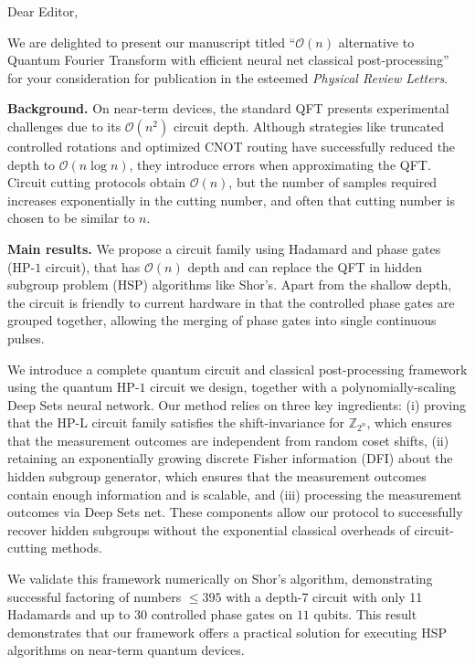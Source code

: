 \documentclass[11pt]{letter}
\newcommand{\ManuscriptTitle}{\(\mathcal{O}(n)\) alternative to Quantum Fourier Transform with efficient neural net classical post-processing}
\newcommand{\Journal}{\textit{Physical Review Letters}}
\begin{document}
\begin{letter}{}

\opening{Dear Editor,}

We are delighted to present our manuscript titled ``\ManuscriptTitle'' for your consideration for publication in the esteemed \Journal.

\textbf{Background.}
On near-term devices, the standard QFT presents experimental challenges due to its \(\mathcal{O}(n^{2})\) circuit depth. Although strategies like truncated controlled rotations and optimized CNOT routing have successfully reduced the depth to \(\mathcal{O}(n \log n)\), they introduce errors when approximating the QFT. Circuit cutting protocols obtain \(\mathcal{O}(n)\), but the number of samples required increases exponentially in the cutting number, and often that cutting number is chosen to be similar to \(n\). 

\textbf{Main results.}
We propose a circuit family using Hadamard and phase gates (HP-\(1\) circuit), that has \(\mathcal{O}(n)\) depth and can replace the QFT in hidden subgroup problem (HSP) algorithms like Shor's. Apart from the shallow depth, the circuit is friendly to current hardware in that the controlled phase gates are grouped together, allowing the merging of phase gates into single continuous pulses.

We introduce a complete quantum circuit and classical post-processing framework using the quantum HP-\(1\) circuit we design, together with a polynomially-scaling Deep Sets neural network. Our method relies on three key ingredients: (i) proving that the HP-L circuit family satisfies the shift-invariance for \(\mathbb{Z}_{2^{n}}\), which ensures that the measurement outcomes are independent from random coset shifts, (ii) retaining an exponentially growing discrete Fisher information (DFI) about the hidden subgroup generator, which ensures that the measurement outcomes contain enough information and is scalable, and (iii) processing the measurement outcomes via Deep Sets net. These components allow our protocol to successfully recover hidden subgroups without the exponential classical overheads of circuit-cutting methods.

We validate this framework numerically on Shor's algorithm, demonstrating successful factoring of numbers \(\leq 395\) with a depth-7 circuit with only 11 Hadamards and up to 30 controlled phase gates on \(11\) qubits. This result demonstrates that our framework offers a practical solution for executing HSP algorithms on near-term quantum devices.


\end{letter}
\end{document}
